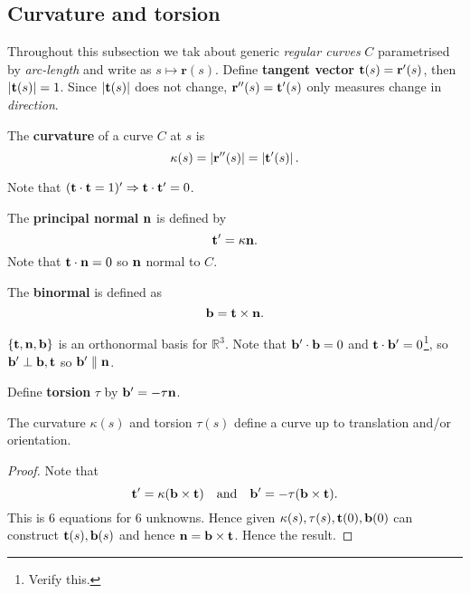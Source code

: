 \subsection{Curvature and torsion}
Throughout this subsection we tak about generic \textit{regular curves} $C$ parametrised by \textit{arc-length} and write as $ s \mapsto \mathbf{r}(s) $. Define \textbf{tangent vector} $ {\bf t}(s)=\mathbf{r}'(s) $, then $ |{\bf t}(s)|=1 $. Since $ |{\bf t}(s)| $ does not change, $ {\bf r}''(s)={\bf t}'(s) $ only measures change in \textit{direction}.

\begin{definition}[Curvature]
    The \textbf{curvature} of a curve $C$ at $s$ is 
    \[
        \kappa(s) = \left| {\bf r}''(s) \right| = \left| {\bf t}'(s) \right|.
    \]
\end{definition}

Note that $ ({\bf t} \cdot {\bf t} =1)' \Rightarrow {\bf t} \cdot {\bf t}'=0 $.
\begin{definition}
    The \textbf{principal normal} ${\bf n}$ is defined by 
    \[
        {\bf t}'=\kappa {\bf n}.
    \]
    Note that $ {\bf t} \cdot {\bf n}=0 $ so ${\bf n}$ normal to $C$.
\end{definition}

\begin{definition}[Binormal]
    The \textbf{binormal} is defined as 
    \[
        {\bf b} = {\bf t} \times {\bf n}.
    \]
\end{definition}

$ \{{\bf t},{\bf n},{\bf b}\} $ is an orthonormal basis for $ \mathbb{R}^{3} $. Note that $ {\bf b}' \cdot {\bf b}=0 $ and $ {\bf t} \cdot {\bf b}'=0 $\footnote{Verify this.}, so $ {\bf b}' \perp {\bf b},{\bf t} $ so $ {\bf b}' \parallel {\bf n} $.

\begin{definition}[Torsion]
    Define \textbf{torsion} $ \tau $ by $ {\bf b}' = -\tau {\bf n} $.
\end{definition}

\begin{proposition}
    The curvature $ \kappa(s) $ and torsion $ \tau(s)$ define a curve up to translation and/or orientation.
\end{proposition}
\begin{proof}
    Note that
    \[
        {\bf t}'=\kappa ({\bf b}\times {\bf t})\quad \text{and}\quad {\bf b}'=-\tau({\bf b}\times {\bf t}).
    \]
    This is 6 equations for 6 unknowns. Hence given $ \kappa(s),\tau(s),{\bf t}(0),{\bf b}(0) $ can construct $ {\bf t}(s),{\bf b}(s) $ and hence ${\bf n}={\bf b}\times {\bf t}$. Hence the result.
\end{proof}

